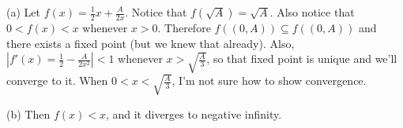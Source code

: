 \begin{description}
\item{(a)} Let $f(x) = \frac{1}{2}x + \frac{A}{2x}$.  Notice that
$f(\sqrt{A}) = \sqrt{A}$.  Also notice that $0 < f(x) < x$ whenever $x >
0$.  Therefore $f((0,A)) \subseteq f((0,A))$ and there exists a fixed
point (but we knew that already).  Also, $|f'(x) = \frac{1}{2} -
\frac{A}{2x^2}| < 1$ whenever $x > \sqrt{\frac{A}{3}}$, so that fixed
point is unique and we'll converge to it.  When $0 < x <
\sqrt{\frac{A}{3}}$, I'm not sure how to show convergence.
\item{(b)} Then $f(x) < x$, and it diverges to negative infinity.
\end{description}
